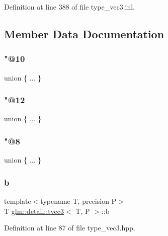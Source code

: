 Definition at line 388 of file type\+\_\+vec3.\+inl.



\subsection{Member Data Documentation}
\mbox{\label{structglm_1_1detail_1_1tvec3_a1690ec662a98597dee6515913e706cf9}} 
\subsubsection{\texorpdfstring{"@10}{@10}}
{\footnotesize\ttfamily union \{ ... \} }

\mbox{\label{structglm_1_1detail_1_1tvec3_a7cba6130b8cadf4f66fe403a4ea32501}} 
\subsubsection{\texorpdfstring{"@12}{@12}}
{\footnotesize\ttfamily union \{ ... \} }

\mbox{\label{structglm_1_1detail_1_1tvec3_a3ca4e74926aebc1b2718c28bf773ab4f}} 
\subsubsection{\texorpdfstring{"@8}{@8}}
{\footnotesize\ttfamily union \{ ... \} }

\mbox{\label{structglm_1_1detail_1_1tvec3_a0b52d699c6157d0e61d841f9171f086e}} 
\subsubsection{\texorpdfstring{b}{b}}
{\footnotesize\ttfamily template$<$typename T, precision P$>$ \\
T \hyperlink{structglm_1_1detail_1_1tvec3}{glm\+::detail\+::tvec3}$<$ T, P $>$\+::b}



Definition at line 87 of file type\+\_\+vec3.\+hpp.

\mbox{\label{structglm_1_1detail_1_1tvec3_aa3cc26bd8e04e78a956df5955e22620d}} 
